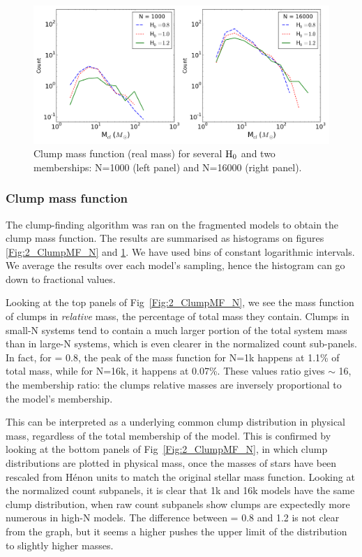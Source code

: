 \begin{figure}
\begin{center}
\includegraphics[width=0.95\columnwidth]{Figures/2_ClumpMF_H.png}
\end{center}
\caption[Clump mass function in real mass for several $\Hub_0$  and two memberships]{Clump mass function (real mass) for several $\Hub_0$  and two memberships: N=1000 (left panel) and N=16000 (right panel).}
\label{Fig:2_ClumpMF_H}
\end{figure} 


\subsubsection*{Clump mass function}
 The clump-finding algorithm was ran on the fragmented models to obtain the clump mass function. The results are summarised as histograms on figures \ref{Fig:2_ClumpMF_N} and \ref{Fig:2_ClumpMF_H}. We have used bins of constant logarithmic intervals. We average the results over each model's sampling, hence the histogram can go down to fractional values.
 
 Looking at the top panels of Fig~\ref{Fig:2_ClumpMF_N}, we see the mass function of clumps in \textit{relative} mass, the percentage of total mass they contain.  Clumps in small-N systems tend to contain a much larger portion of the total system mass than in large-N systems, which is even clearer in the normalized count sub-panels. In fact, for \tHub = 0.8, the peak of the mass function for N=1k happens at 1.1\% of total mass, while for N=16k, it happens at 0.07\%. These values ratio gives $\sim$ 16, the membership ratio: the clumps relative masses are inversely proportional to the model's membership.
 
This can be interpreted as a underlying common clump distribution in physical mass, regardless of the total membership of the model. This is confirmed by looking at the bottom panels of Fig~\ref{Fig:2_ClumpMF_N}, in which clump distributions are plotted in physical mass, once the masses of stars have been rescaled from H\'enon units to match the original stellar mass function. Looking at the normalized count subpanels, it is clear that 1k and 16k models have the same clump distribution, when raw count subpanels show clumps are expectedly more numerous in high-N models. The difference between \tHub = 0.8 and 1.2 is not clear from the graph, but it seems a higher \tHub pushes the upper limit of the distribution to slightly higher masses.

